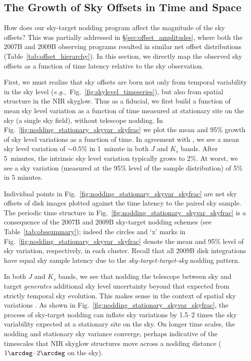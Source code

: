 \documentclass[iop]{emulateapj}
\newcommand{\eg}{\textit{e.g.,~}}
\newcommand{\Fig}[1]{Fig.~\ref{fig:#1}}  %
\newcommand{\Tab}[1]{Table~\ref{tab:#1}}  %
\newcommand{\Sec}[1]{\S\ref{sec:#1}}  %
\begin{document}
\subsection{The Growth of Sky Offsets in Time and Space}
\label{sec:offsetevo}


How does our sky-target nodding program affect the magnitude of the sky offsets?
This was partially addressed in \Sec{offset_amplitudes}, where both the 2007B and 2009B observing programs resulted in similar net offset distributions (\Tab{offset_hierarchy}).
In this section, we directly map the observed sky offsets as a function of time latency relative to the sky observation.

First, we must realize that sky offsets are born not only from temporal variability in the sky level (\eg \Fig{skylevel_timeseries}), but also from spatial structure in the NIR skyglow.
Thus as a fiducial, we first build a function of mean sky level variation as a function of time measured at stationary site on the sky (a single sky field), without telescope nodding.
In \Fig{nodding_stationary_skyvar_skyfrac} we plot the mean and 95\% growth of sky level variations as a function of time.
In agreement with \cite{Vaduvescu:2004}, we see a mean sky level variation of $\sim 0.5\%$ in 1~minute in both $J$ and $K_s$ bands.
After 5~minutes, the intrinsic sky level variation typically grows to 2\%.
At worst, we see a sky variation (measured at the 95\% level of the sample distribution) of 5\% in 5 minutes.

Individual points in \Fig{nodding_stationary_skyvar_skyfrac} are net sky offsets of disk images plotted against the time latency to the paired sky sample.
The periodic time structure in \Fig{nodding_stationary_skyvar_skyfrac} is a consequence of the 2007B and 2009B sky-target nodding schemes (see \Tab{obssummary}); indeed the circles and `x' marks in \Fig{nodding_stationary_skyvar_skyfrac} denote the mean and 95\% level of sky variation, respectively, in each cluster.
Recall that all 2009B disk integrations have equal sky sample latency due to the \emph{sky-target-target-sky} nodding pattern.

In both $J$ and $K_s$ bands, we see that nodding the telescope between sky and target \emph{generates} additional sky level uncertainty beyond that expected from strictly temporal sky evolution.
This makes sense in the context of spatial sky variations \citep{Adams:1996}.
As shown in \Fig{nodding_stationary_skyvar_skyfrac}, the process of sky-target nodding can inflate sky variations by 1.5--2 times the sky variability expected at a stationary site on the sky.
On longer time scales, the nodding and stationary sky variance converge, perhaps indicative of the timescales that NIR skyglow structures move across a nodding distance ($1\arcdeg$--$2\arcdeg$ on the sky).
\end{document}
